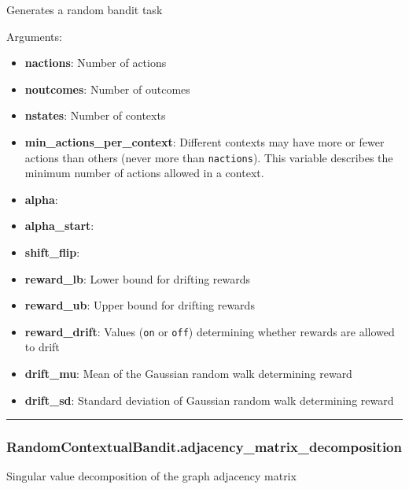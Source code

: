Generates a random bandit task

Arguments:

\begin{itemize}
\tightlist
\item
  \textbf{nactions}: Number of actions
\item
  \textbf{noutcomes}: Number of outcomes
\item
  \textbf{nstates}: Number of contexts
\item
  \textbf{min\_actions\_per\_context}: Different contexts may have more
  or fewer actions than others (never more than \texttt{nactions}). This
  variable describes the minimum number of actions allowed in a context.
\item
  \textbf{alpha}:
\item
  \textbf{alpha\_start}:
\item
  \textbf{shift\_flip}:
\item
  \textbf{reward\_lb}: Lower bound for drifting rewards
\item
  \textbf{reward\_ub}: Upper bound for drifting rewards
\item
  \textbf{reward\_drift}: Values (\texttt{on} or \texttt{off})
  determining whether rewards are allowed to drift
\item
  \textbf{drift\_mu}: Mean of the Gaussian random walk determining
  reward
\item
  \textbf{drift\_sd}: Standard deviation of Gaussian random walk
  determining reward
\end{itemize}

\begin{center}\rule{0.5\linewidth}{\linethickness}\end{center}

\subsubsection{RandomContextualBandit.adjacency\_matrix\_decomposition}\label{randomcontextualbandit.adjacency_matrix_decomposition}

\begin{Shaded}
\begin{Highlighting}[]
\NormalTok{)}
\end{Highlighting}
\end{Shaded}

Singular value decomposition of the graph adjacency matrix

